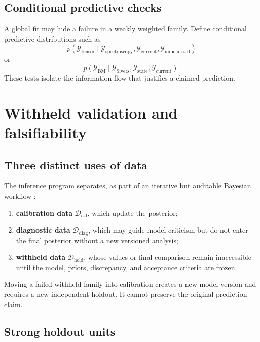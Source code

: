 \documentclass[11pt]{article}
\newcommand{\cY}{\mathcal Y}
\newcommand{\caldata}{\mathcal D_{\mathrm{cal}}}
\newcommand{\diagdata}{\mathcal D_{\mathrm{diag}}}
\newcommand{\holddata}{\mathcal D_{\mathrm{hold}}}
\begin{document}
\subsection{Conditional predictive checks}

A global fit may hide a failure in a weakly weighted family.  Define
conditional predictive distributions such as
\begin{equation}
 p(
 \cY_{\mathrm{tensor}}
 \mid
 \cY_{\mathrm{spectroscopy}},
 \cY_{\mathrm{current}},
 \cY_{\mathrm{unpolarized}}
 )
 \label{eq:conditional-predictive-family}
\end{equation}
or
\begin{equation}
 p(
 \cY_{\mathrm{BM}}
 \mid
 \cY_{\mathrm{Sivers}},
 \cY_{\mathrm{state}},
 \cY_{\mathrm{current}}
 ).
 \label{eq:sivers-to-bm-predictive}
\end{equation}
These tests isolate the information flow that justifies a claimed prediction.

\section{Withheld validation and falsifiability}
\label{sec:withheld-validation}

\subsection{Three distinct uses of data}

The inference program separates, as part of an iterative but auditable Bayesian workflow \cite{GelmanWorkflow2020}:
\begin{enumerate}
\item \textbf{calibration data} \(\caldata\), which update the posterior;
\item \textbf{diagnostic data} \(\diagdata\), which may guide model criticism
but do not enter the final posterior without a new versioned analysis;
\item \textbf{withheld data} \(\holddata\), whose values or final comparison
remain inaccessible until the model, priors, discrepancy, and acceptance
criteria are frozen.
\end{enumerate}
Moving a failed withheld family into calibration creates a new model version
and requires a new independent holdout.  It cannot preserve the original
prediction claim.

\subsection{Strong holdout units}
\end{document}
